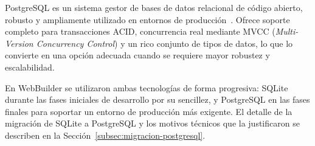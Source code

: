 PostgreSQL es un sistema gestor de bases de datos relacional de código abierto, robusto y ampliamente utilizado en entornos de producción~\cite{postgresql_docs}. Ofrece soporte completo para transacciones ACID, concurrencia real mediante MVCC (\emph{Multi-Version Concurrency Control}) y un rico conjunto de tipos de datos, lo que lo convierte en una opción adecuada cuando se requiere mayor robustez y escalabilidad.

En WebBuilder se utilizaron ambas tecnologías de forma progresiva: SQLite durante las fases iniciales de desarrollo por su sencillez, y PostgreSQL en las fases finales para soportar un entorno de producción más exigente. El detalle de la migración de SQLite a PostgreSQL y los motivos técnicos que la justificaron se describen en la Sección~\ref{subsec:migracion-postgresql}.

